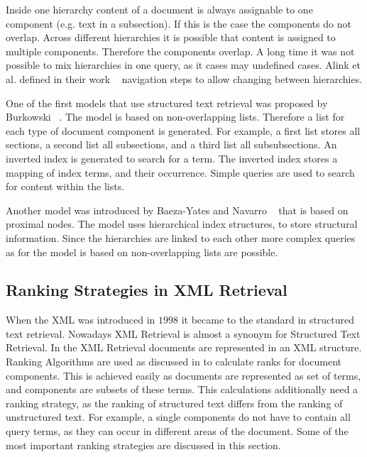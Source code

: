 Inside one hierarchy content of a document is always assignable to one component (e.g. text in a subsection). If this is the case the components do not overlap. Across different hierarchies it is possible that content is assigned to multiple components. Therefore the components overlap. A long time it was not possible to mix hierarchies in one query, as it cases may undefined cases. Alink et al. defined in their work ~\cite{AlinkBBV06} navigation steps to allow changing between hierarchies.  

One of the first models that use structured text retrieval was proposed by Burkowski ~\cite{BURKOWSKI1992333, Burkowski92}. The model is based on non-overlapping lists. Therefore a list for each type of document component is generated. For example, a first list stores all sections, a second list all subsections, and a third list all subsubsections. An inverted index is generated to search for a term. The inverted index stores a mapping of index terms, and their occurrence. Simple queries are used to search for content within the lists.

Another model was introduced by Baeza-Yates and Navarro ~\cite{GB95, GB97} that is based on proximal nodes. The model uses hierarchical index structures, to store structural information. Since the hierarchies are linked to each other more complex queries as for the model is based on non-overlapping lists are possible.

\subsection{Ranking Strategies in XML Retrieval}
\label{sec:ranking_strategies_in_xml_retrieval}

When the XML was introduced in $1998$ it became to the standard in structured text retrieval. Nowadays XML Retrieval is almost a synonym for Structured Text Retrieval. In the XML Retrieval documents are represented in an XML structure. Ranking Algorithms are used as discussed in  to calculate ranks for document components. This is achieved easily as documents are represented as set of terms, and components are subsets of these terms. This calculations additionally need a ranking strategy, as the ranking of structured text differs from the ranking of unstructured text. For example, a single components do not have to contain all query terms, as they can occur in different areas of the document. Some of the most important ranking strategies are discussed in this section.

